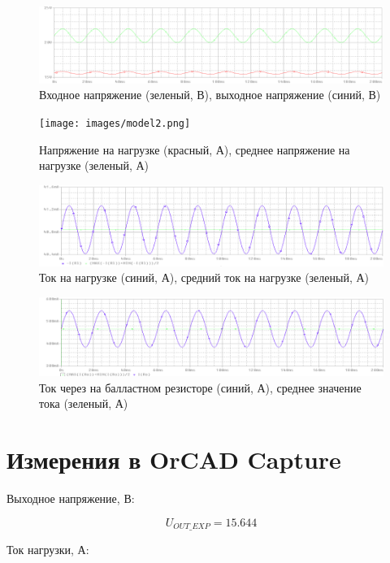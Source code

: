 \begin{figure}[h!]
	\centering
	\caption{Входное напряжение (зеленый, В), выходное напряжение (синий, В)}
	\includegraphics{images/model1.png}
\end{figure}

\begin{figure}[h!]
	\centering
	\caption{Напряжение на нагрузке (красный, А), среднее напряжение на нагрузке (зеленый, А)}
	\texttt{[image: images/model2.png]}
\end{figure}

\begin{figure}[h!]
	\centering
	\caption{Ток на нагрузке (синий, А), средний ток на нагрузке (зеленый, А)}
	\includegraphics{images/model3.png}
\end{figure}

\begin{figure}[h!]
	\centering
	\caption{Ток через на балластном резисторе (синий, А), среднее значение тока (зеленый, А)}
	\includegraphics{images/model4.png}
\end{figure}


\section{Измерения в OrCAD Capture}

Выходное напряжение, В:

\[
U_{OUT\_EXP} = 15.644 
\]

Ток нагрузки, А:			        				

